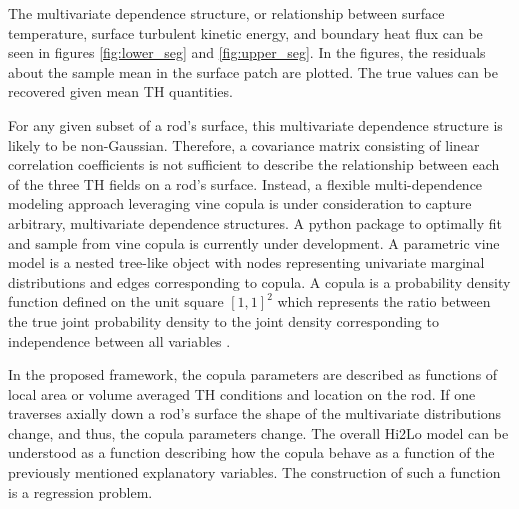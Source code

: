 \documentclass{anstrans}
\begin{document}
The multivariate dependence structure, or relationship between surface temperature, surface
turbulent kinetic energy,
and boundary heat flux can be seen in figures \ref{fig:lower_seg} and
\ref{fig:upper_seg}.  In the figures, the residuals about the sample mean in
the surface patch are plotted.  The true values can be recovered given mean TH
quantities.

%

For any given subset of a rod's surface, this multivariate dependence structure is likely to
be non-Gaussian. Therefore, a covariance matrix consisting of linear correlation coefficients is not sufficient
to describe the relationship between each of the three TH fields on a rod's
surface.  Instead, a flexible multi-dependence modeling approach leveraging
vine copula is under consideration to capture arbitrary, multivariate
dependence structures.  A python package to optimally fit and sample from vine
copula is currently under development.  A parametric vine model is a nested
tree-like object with nodes representing univariate marginal distributions and
edges corresponding to copula.  A copula is a probability density function
defined on the unit square $[1, 1]^2$ which represents the ratio between the true
joint probability density to the joint density corresponding to independence between
all variables \cite{joe2015}.

In the proposed framework, the copula parameters are described as functions of
local area or volume averaged TH conditions and location on the rod. If
one traverses axially down a rod's surface the shape of the multivariate
distributions change, and thus, the copula parameters change.  The overall Hi2Lo
 model can be understood as a function describing how the copula
behave as a function of the previously mentioned explanatory variables.  The
construction of such a function is a regression problem.
\end{document}

